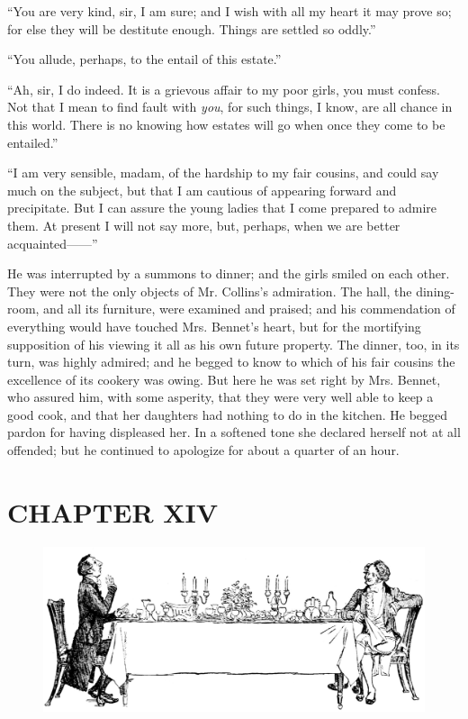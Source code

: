 ``You are very kind, sir, I am sure; and I wish with all my heart it may prove so; for else they will be destitute enough. Things are settled so oddly.''

``You allude, perhaps, to the entail of this estate.''

``Ah, sir, I do indeed. It is a grievous affair to my poor girls, you must confess. Not that I mean to find fault with \textit{you}, for such things, I know, are all chance in this world. There is no knowing how estates will go when once they come to be entailed.''

``I am very sensible, madam, of the hardship to my fair cousins, and could say much on the subject, but that I am cautious of appearing forward and precipitate. But I can assure the young ladies that I come prepared to admire them. At present I will not say more, but, perhaps, when we are better acquainted------''

He was interrupted by a summons to dinner; and the girls smiled on each other. They were not the only objects of Mr. Collins's admiration. The hall, the dining-room, and all its furniture, were examined and praised; and his commendation of everything would have touched Mrs. Bennet's heart, but for the mortifying supposition of his viewing it all as his own future property. The dinner, too, in its turn, was highly admired; and he begged to know to which of his fair cousins the excellence of its cookery was owing. But here he was set right by Mrs. Bennet, who assured him, with some asperity, that they were very well able to keep a good cook, and that her daughters had nothing to do in the kitchen. He begged pardon for having displeased her. In a softened tone she declared herself not at all offended; but he continued to apologize for about a quarter of an hour.

\chapter{CHAPTER XIV}

\begin{figure}[htbp]
    \centering
    \includegraphics[width=\textwidth]{illustrations/i_113_a.jpg}
\end{figure}

